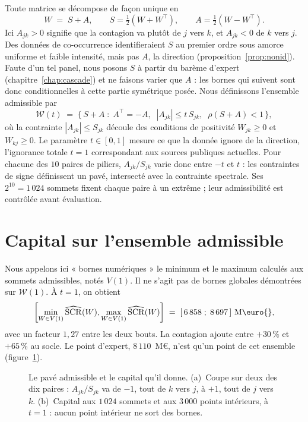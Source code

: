 Toute matrice se décompose de façon unique en
\[
  W \;=\; S + A, \qquad S = \tfrac{1}{2}(W + W^{\top}), \qquad A = \tfrac{1}{2}(W - W^{\top}) .
\]
Ici $A_{jk}>0$ signifie que la contagion va plutôt de $j$ vers $k$, et $A_{jk}<0$ de $k$ vers $j$. Des
données de co-occurrence identifieraient $S$ au premier ordre sous amorce uniforme et faible intensité, mais pas $A$, la direction
(proposition~\ref{prop:nonid}). Faute d'un tel panel, nous posons $S$ à partir du barème d'expert
(chapitre~\ref{chap:cascade}) et ne faisons varier que $A$ : les bornes qui suivent sont donc
conditionnelles à cette partie symétrique posée. Nous définissons l'ensemble admissible par
\[
  \mathcal{W}(t) \;=\; \bigl\{\, S + A \;:\; A^{\top} = -A, \;\; |A_{jk}| \leq t\,S_{jk},
  \;\; \rho(S+A) < 1 \,\bigr\},
\]
où la contrainte $|A_{jk}| \leq S_{jk}$ découle des conditions de positivité $W_{jk}\geq 0$ et
$W_{kj}\geq 0$. Le paramètre $t\in[0,1]$ mesure ce que la donnée ignore de la direction, l'ignorance
totale $t=1$ correspondant aux sources publiques actuelles. Pour chacune des $10$ paires de piliers,
$A_{jk}/S_{jk}$ varie donc entre $-t$ et $t$ : les contraintes de signe définissent un pavé, intersecté avec la contrainte spectrale. Ses $2^{10} = 1\,024$ sommets fixent chaque paire à un extrême ; leur admissibilité est contrôlée avant évaluation.


\section{Capital sur l'ensemble admissible}

Nous appelons ici « bornes numériques » le minimum et le maximum calculés aux sommets admissibles, notés $V(1)$. Il ne s'agit pas de bornes globales démontrées sur $\mathcal W(1)$. À $t=1$, on obtient
\[
  \left[\min_{W\in V(1)}\widehat{\mathrm{SCR}}(W),\max_{W\in V(1)}\widehat{\mathrm{SCR}}(W)\right] \;=\; [\,6\,858 \;;\; 8\,697\,]~\text{M\euro{}} ,
\]
avec un facteur $1{,}27$ entre les deux bouts. La contagion ajoute entre $+30\,\%$ et
$+65\,\%$ au socle. Le point d'expert, $8\,110$~M\euro{}, n'est qu'un point de cet ensemble
(figure~\ref{fig:pave-sommets}).

\begin{figure}[H]
  \centering
  \caption{Le pavé admissible et le capital qu'il donne. (a)~Coupe sur deux des dix paires :
$A_{jk}/S_{jk}$ va de $-1$, tout de $k$ vers $j$, à $+1$, tout de $j$ vers $k$. (b)~Capital aux
$1\,024$ sommets et aux $3\,000$ points intérieurs, à $t = 1$ : aucun point intérieur ne sort des bornes.}
  \label{fig:pave-sommets}
\end{figure}

